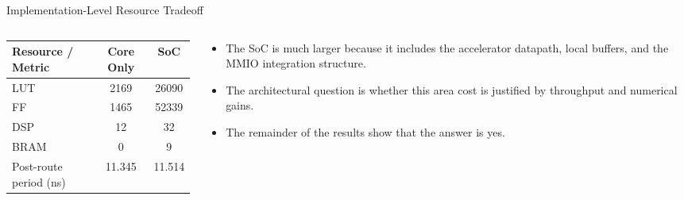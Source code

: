 \documentclass[aspectratio=169]{beamer}
\begin{document}
\begin{frame}{Implementation-Level Resource Tradeoff}
\begin{columns}[T,totalwidth=\textwidth]
\begin{column}{0.52\textwidth}
\centering
\small
\begin{tabular}{lcc}
\toprule
Resource / Metric & Core Only & SoC \\
\midrule
LUT & 2169 & 26090 \\
FF & 1465 & 52339 \\
DSP & 12 & 32 \\
BRAM & 0 & 9 \\
Post-route period (ns) & 11.345 & 11.514 \\
\bottomrule
\end{tabular}
\end{column}
\begin{column}{0.45\textwidth}
\small
\begin{itemize}
\item The SoC is much larger because it includes the accelerator datapath, local buffers, and the MMIO integration structure.
\item The architectural question is whether this area cost is justified by throughput and numerical gains.
\item The remainder of the results show that the answer is yes.
\end{itemize}
\end{column}
\end{columns}
\end{frame}
\end{document}
